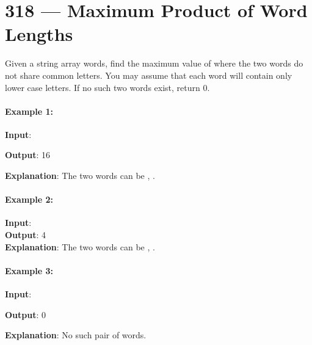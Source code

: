 \section{318 --- Maximum Product of Word Lengths}
Given a string array words, find the maximum value of  where the two words do not share common letters. You may assume that each word will contain only lower case letters. If no such two words exist, return 0.

\paragraph{Example 1:}

\begin{flushleft}
\textbf{Input}: 

\textbf{Output}: 16

\textbf{Explanation}: The two words can be , .
\end{flushleft}

\paragraph{Example 2:}

\begin{flushleft}
\textbf{Input}: 
\\
\textbf{Output}: 4 
\\
\textbf{Explanation}: The two words can be , .
\end{flushleft}

\paragraph{Example 3:}

\begin{flushleft}
\textbf{Input}: 

\textbf{Output}: 0 

\textbf{Explanation}: No such pair of words.
\end{flushleft}
